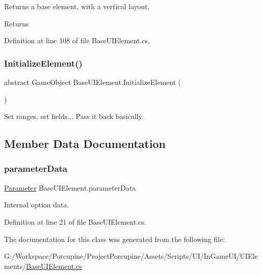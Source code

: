 Returns a base element, with a vertical layout. 

\begin{DoxyReturn}{Returns}

\end{DoxyReturn}


Definition at line 108 of file Base\+U\+I\+Element.\+cs.

\mbox{\label{class_base_u_i_element_a9a0aa6ac0b194f90e092b372adce4e30}} 
\subsubsection{\texorpdfstring{Initialize\+Element()}{InitializeElement()}}
{\footnotesize\ttfamily abstract Game\+Object Base\+U\+I\+Element.\+Initialize\+Element (\begin{DoxyParamCaption}{ }\end{DoxyParamCaption})\hspace{0.3cm}{\ttfamily [pure virtual]}}



Set ranges, set fields... Pass it back basically. 



\subsection{Member Data Documentation}
\mbox{\label{class_base_u_i_element_a1c66251d0672fb0931f92f5f604bd56a}} 
\subsubsection{\texorpdfstring{parameter\+Data}{parameterData}}
{\footnotesize\ttfamily \hyperlink{class_parameter}{Parameter} Base\+U\+I\+Element.\+parameter\+Data}



Internal option data. 



Definition at line 21 of file Base\+U\+I\+Element.\+cs.



The documentation for this class was generated from the following file\+:\begin{DoxyCompactItemize}
\item 
G\+:/\+Workspace/\+Porcupine/\+Project\+Porcupine/\+Assets/\+Scripts/\+U\+I/\+In\+Game\+U\+I/\+U\+I\+Elements/\hyperlink{_base_u_i_element_8cs}{Base\+U\+I\+Element.\+cs}\end{DoxyCompactItemize}
